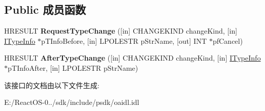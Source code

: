 \subsection*{Public 成员函数}
\begin{DoxyCompactItemize}
\item 
\mbox{\label{interface_i_type_change_events_a67c0c95be1e24cccb5ed70045ebeadf8}} 
H\+R\+E\+S\+U\+LT {\bfseries Request\+Type\+Change} (\mbox{[}in\mbox{]} C\+H\+A\+N\+G\+E\+K\+I\+ND change\+Kind, \mbox{[}in\mbox{]} \hyperlink{interface_i_type_info}{I\+Type\+Info} $\ast$p\+T\+Info\+Before, \mbox{[}in\mbox{]} L\+P\+O\+L\+E\+S\+TR p\+Str\+Name, \mbox{[}out\mbox{]} I\+NT $\ast$pf\+Cancel)
\item 
\mbox{\label{interface_i_type_change_events_ad5a03da89d5474b62aa3eab7e5666262}} 
H\+R\+E\+S\+U\+LT {\bfseries After\+Type\+Change} (\mbox{[}in\mbox{]} C\+H\+A\+N\+G\+E\+K\+I\+ND change\+Kind, \mbox{[}in\mbox{]} \hyperlink{interface_i_type_info}{I\+Type\+Info} $\ast$p\+T\+Info\+After, \mbox{[}in\mbox{]} L\+P\+O\+L\+E\+S\+TR p\+Str\+Name)
\end{DoxyCompactItemize}


该接口的文档由以下文件生成\+:\begin{DoxyCompactItemize}
\item 
E\+:/\+React\+O\+S-\/0../sdk/include/psdk/oaidl.\+idl\end{DoxyCompactItemize}
